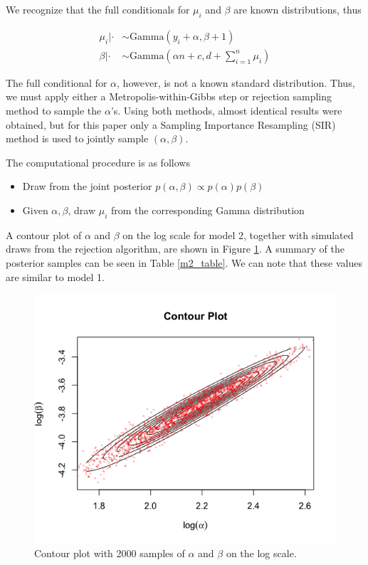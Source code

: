 \documentclass{asaproc}
\newcommand{\sumi}{\sum_{i=1}^n}
\newcommand{\Gam}{\text{Gamma}}
\begin{document}
We recognize that the full conditionals for $\mu_i$ and $\beta$ are known distributions, thus

\begin{align*}
    \mu_i|\cdot &\sim \Gam(y_i + \alpha, \beta +1)\\
    \beta|\cdot &\sim \Gam(\alpha n + c, d + \sumi \mu_i)
\end{align*}

The full conditional for $\alpha$, however, is not a known standard distribution. Thus, we must apply either a Metropolis-within-Gibbs step or rejection sampling method to sample the $\alpha$'s. Using both methods, almost identical results were obtained, but for this paper only a Sampling Importance Resampling (SIR) method is used to jointly sample $(\alpha, \beta)$. 

The computational procedure is as follows
\begin{itemize}
    \item Draw from the joint posterior $p(\alpha, \beta) \propto p(\alpha) p(\beta)$
    \item Given $\alpha,\beta$, draw $\mu_i$ from the corresponding Gamma distribution
\end{itemize}

A contour plot of $\alpha$ and $\beta$ on the log scale for model 2, together with simulated draws from the rejection algorithm, are shown in Figure \ref{contour}. A summary of the posterior samples can be seen in Table \ref{m2_table}. We can note that these values are similar to model 1.

\begin{figure}[h!]
    \centering
    \includegraphics[scale = 0.4]{Contour.png}
    \caption{Contour plot with 2000 samples of $\alpha$ and $\beta$ on the log scale.}
    \label{contour}
\end{figure}
\end{document}
